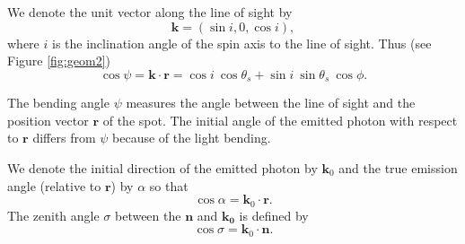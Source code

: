 \documentclass{wihuri}
\def\be{\begin{equation}}
\def\ee{\end{equation}}
\def\thetas{\theta_{s}}
\newcommand{\bmath}[1]{\boldsymbol{#1}}
\begin{document}
We denote the unit vector along the line of sight by 
\be
\bmath{k}=(\sin i, 0, \cos i), 
\ee 
where $i$ is the inclination angle of the spin axis to the line of sight. 
Thus (see Figure \ref{fig:geom2})
\be \label{eq:psi2}
  \cos\psi=\bmath{k}\cdot \bmath{r} = \cos i\ \cos\thetas+\sin i\ \sin \thetas\ \cos\phi.
\ee

The bending angle $\psi$ measures the angle between the line of sight and the position vector $\bmath{r}$ of the spot. The initial angle of the emitted photon with respect to
 ${\mathbf r}$ differs from $\psi$ because of the light bending.



We denote the initial direction of the emitted photon by $\bmath{k}_0$ %
and the true emission angle (relative to $\bmath{r}$) by $\alpha$ so that
\be
 \cos\alpha=\bmath{k}_0 \cdot \bmath{r}.
\ee
The zenith angle $\sigma$ between the $\bmath{n}$ and $\bmath{k_{0}}$ is defined by 
\be
\cos\sigma = \bmath{k}_{0}\cdot\bmath{n}.
\ee
\end{document}
